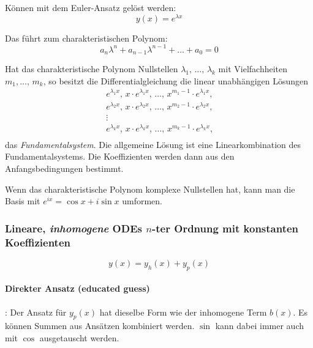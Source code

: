\documentclass[a4paper,10pt]{article}
\begin{document}
Können mit dem Euler-Ansatz gelöst werden:
\[
    y(x) = e^{\lambda x}
\]

Das führt zum charakteristischen Polynom:
\[
    a_n \lambda^n + a_{n - 1} \lambda^{n - 1} + \dots + a_0 = 0
\]

Hat das charakteristische Polynom Nullstellen \( \lambda_1, \, \dots, \, \lambda_k \) mit Vielfachheiten \( m_1, \dots, \, m_k \), so besitzt die Differentialgleichung die linear unabhängigen Lösungen \begin{gather*}
    e^{\lambda_1 x}, \, x \cdot e^{\lambda_1 x}, \, \dots, \, x^{m_1 - 1} \cdot e^{\lambda_1 x} \text{,} \\
    e^{\lambda_2 x}, \, x \cdot e^{\lambda_2 x}, \, \dots, \, x^{m_2 - 1} \cdot e^{\lambda_2 x} \text{,} \\
    \vdots \\
    e^{\lambda_k x}, \, x \cdot e^{\lambda_k x}, \, \dots, \, x^{m_k - 1} \cdot e^{\lambda_k x} \text{,} \\
\end{gather*}
das \emph{Fundamentalsystem}. Die allgemeine Lösung ist eine Linearkombination des Fundamentalsystems. Die Koeffizienten werden dann aus den Anfangsbedingungen bestimmt.

Wenn das charakteristische Polynom komplexe Nullstellen hat, kann man die Basis mit \( e^{ix} = \cos x + i \sin x \) umformen.


\subsubsection{Lineare, \emph{inhomogene} ODEs \texorpdfstring{\( n \)}{n}-ter Ordnung mit konstanten Koeffizienten}

\begin{mainbox}{}
    \[
        y(x) = y_h(x) + y_p(x)
    \]
\end{mainbox}

\paragraph{Direkter Ansatz (educated guess)}: Der Ansatz für \( y_p(x) \) hat dieselbe Form wie der inhomogene Term \( b(x) \). Es können Summen aus Ansätzen kombiniert werden. \( \sin \) kann dabei immer auch mit \( \cos \) ausgetauscht werden.
\end{document}
